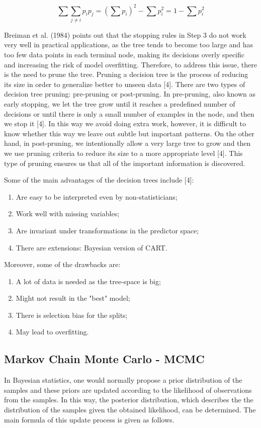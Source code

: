 \documentclass{usiinftr}
\begin{document}
\begin{equation}
\sum \sum_{j \neq i} p_{i} p_{j}=\left(\sum p_{i}\right)^{2}-\sum p_{i}^{2}=1-\sum p_{i}^{2}
\end{equation}

Breiman et al. (1984) points out that the stopping rules in Step 3 do not work very well in practical applications, as the tree tends to become too large and has too few data points in each terminal node, making its decisions overly specific and increasing the risk of model overfitting. Therefore, to address this issue, there is the need to prune the tree. Pruning a decision tree is the process of reducing its size in order to generalize better to unseen data [4]. There are two types of decision tree pruning: pre-pruning or post-pruning. In pre-pruning, also known as early stopping, we let the tree grow until it reaches a predefined number of decisions or until there is only a small number of examples in the node, and then we stop it [4]. In this way we avoid doing extra work, however, it is difficult to know whether this way we leave out subtle but important patterns. On the other hand, in post-pruning, we intentionally allow a very large tree to grow and then we use pruning criteria to reduce its size to a more appropriate level [4]. This type of pruning ensures us that all of the important information is discovered. 
	
Some of the main advantages of the decision trees include [4]:
\begin{enumerate}
\item Are easy to be interpreted even by non-statisticians;
\item Work well with missing variables;
\item Are invariant under transformations in the predictor space;
\item There are extensions: Bayesian version of CART.
\end{enumerate}

Moreover, some of the drawbacks are:
\begin{enumerate}
\item A lot of data is needed as the tree-space is big;
\item Might not result in the "best" model;
\item There is selection bias for the splits;
\item May lead to overfitting.
\end{enumerate}

\subsection{Markov Chain Monte Carlo - MCMC}
In Bayesian statistics, one would normally propose a prior distribution of the samples and these priors are updated according to the likelihood of observations from the samples. In this way, the posterior distribution, which describes the the distribution of the samples given the obtained likelihood, can be determined. The main formula of this update process is given as follows.
\end{document}
